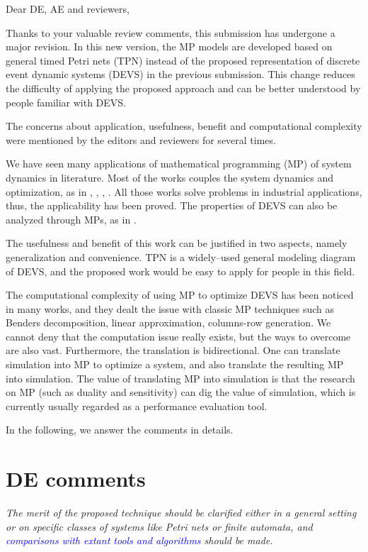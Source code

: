\documentclass[suppldata]{interact}
\begin{document}
\noindent
Dear DE, AE and reviewers,

Thanks to your valuable review comments, this submission has undergone a major revision. In this new version, the MP models are developed based on general timed Petri nets (TPN) instead of the proposed representation of discrete event dynamic systems (DEVS) in the previous submission. This change reduces the difficulty of applying the proposed approach and can be better understood by people familiar with DEVS.


The concerns about application, usefulness, benefit and computational complexity were mentioned by the editors and reviewers for several times. 


We have seen many applications of mathematical programming (MP) of system dynamics in literature. Most of the works couples the system dynamics and optimization, as in \cite{di2020makespan}, \cite{weiss2015buffer}, \cite{bemporad1999control}, \cite{alfieri2020time}. All those works solve problems in industrial applications, thus, the applicability has been proved. The properties of DEVS can also be analyzed through MPs, as in \cite{basile2012k}.


The usefulness and benefit of this work can be justified in two aspects, namely generalization and convenience. TPN is a widely--used general modeling diagram of DEVS, and the proposed work would be easy to apply for people in this field.


The computational complexity of using MP to optimize DEVS has been noticed in many works, and they dealt the issue with classic MP techniques such as Benders decomposition, linear approximation, columns-row generation. We cannot deny that the computation issue really exists, but the ways to overcome are also vast. Furthermore, the translation is bidirectional. One can translate simulation into MP to optimize a system, and also translate the resulting MP into simulation. The value of translating MP into simulation is that the research on MP (such as duality and sensitivity) can dig the value of simulation, which is currently usually regarded as a performance evaluation tool. 


In the following, we answer the comments in details. 



\section{DE comments}
\textit{The merit of the proposed technique should be clarified either in a general setting or on specific classes of systems like Petri nets or finite automata, and \textcolor{blue}{comparisons with extant tools and algorithms} should be made.}
\end{document}

